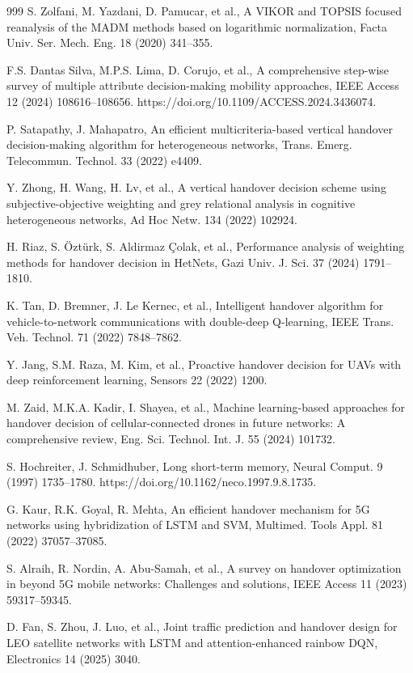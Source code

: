 \documentclass[preprint,12pt]{elsarticle}
\begin{document}
\begin{thebibliography}{999}
S. Zolfani, M. Yazdani, D. Pamucar, et al., A VIKOR and TOPSIS focused reanalysis of the MADM methods based on logarithmic normalization, Facta Univ. Ser. Mech. Eng. 18 (2020) 341--355.

F.S. Dantas Silva, M.P.S. Lima, D. Corujo, et al., A comprehensive step-wise survey of multiple attribute decision-making mobility approaches, IEEE Access 12 (2024) 108616--108656. https://doi.org/10.1109/ACCESS.2024.3436074.

P. Satapathy, J. Mahapatro, An efficient multicriteria-based vertical handover decision-making algorithm for heterogeneous networks, Trans. Emerg. Telecommun. Technol. 33 (2022) e4409.

Y. Zhong, H. Wang, H. Lv, et al., A vertical handover decision scheme using subjective-objective weighting and grey relational analysis in cognitive heterogeneous networks, Ad Hoc Netw. 134 (2022) 102924.

H. Riaz, S. Öztürk, S. Aldirmaz Çolak, et al., Performance analysis of weighting methods for handover decision in HetNets, Gazi Univ. J. Sci. 37 (2024) 1791--1810.

K. Tan, D. Bremner, J. Le Kernec, et al., Intelligent handover algorithm for vehicle-to-network communications with double-deep Q-learning, IEEE Trans. Veh. Technol. 71 (2022) 7848--7862.

Y. Jang, S.M. Raza, M. Kim, et al., Proactive handover decision for UAVs with deep reinforcement learning, Sensors 22 (2022) 1200.

M. Zaid, M.K.A. Kadir, I. Shayea, et al., Machine learning-based approaches for handover decision of cellular-connected drones in future networks: A comprehensive review, Eng. Sci. Technol. Int. J. 55 (2024) 101732.

S. Hochreiter, J. Schmidhuber, Long short-term memory, Neural Comput. 9 (1997) 1735--1780. https://doi.org/10.1162/neco.1997.9.8.1735.

G. Kaur, R.K. Goyal, R. Mehta, An efficient handover mechanism for 5G networks using hybridization of LSTM and SVM, Multimed. Tools Appl. 81 (2022) 37057--37085.

S. Alraih, R. Nordin, A. Abu-Samah, et al., A survey on handover optimization in beyond 5G mobile networks: Challenges and solutions, IEEE Access 11 (2023) 59317--59345.

D. Fan, S. Zhou, J. Luo, et al., Joint traffic prediction and handover design for LEO satellite networks with LSTM and attention-enhanced rainbow DQN, Electronics 14 (2025) 3040.


\end{thebibliography}
\end{document}
